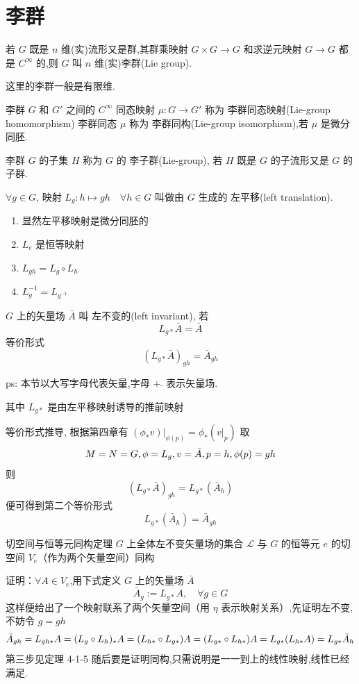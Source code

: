 \documentclass[../main.tex]{subfiles}
\begin{document}
 \chapter{李群}
 \begin{definition}
     若 $G$ 既是 $n$ 维(实)流形又是群,其群乘映射 $G\times G\rightarrow G$ 和求逆元映射 $G\rightarrow G$ 都是 $C^\infty$ 的,则 $G$ 叫 $n$ 维(实)李群(Lie group).
 \end{definition}
     这里的李群一般是有限维.
 \begin{definition}
     李群 $G$ 和 $G'$ 之间的 $C^\infty$ 同态映射 $\mu : G\rightarrow G'$ 称为 李群同态映射(Lie-group homomorphism) 李群同态 $\mu$ 称为 李群同构(Lie-group isomorphism),若 $\mu$ 是微分同胚.
 \end{definition}
 \begin{definition}
     李群 $G$ 的子集 $H$ 称为 $G$ 的 李子群(Lie-group), 若 $H$ 既是 $G$ 的子流形又是 $G$ 的子群.
 \end{definition}
 \begin{definition}
      $\forall g \in G$, 映射 $L_g : h \mapsto gh \quad \forall h \in G$ 叫做由 $G$ 生成的 左平移(left translation).
 \end{definition}
 \begin{enumerate}
     \item 显然左平移映射是微分同胚的
     \item $L_e$ 是恒等映射
     \item $L_{gh} = L_g \circ L_h$
     \item $L_g^{-1} = L_{g^{-1}}$
 \end{enumerate}
 \begin{definition}
      $G$ 上的矢量场 $\bar{A}$ 叫 左不变的(left invariant), 若
     $$
     L_{g*} \bar{A} = \bar{A}
     $$
     等价形式
     $$
     (L_{g*}\bar{A})_{gh} = \bar{A}_{gh}
     $$
 \end{definition}
 ps: 本节以大写字母代表矢量,字母 $+\bar{}$ 表示矢量场.

 其中 $L_{g*}$ 是由左平移映射诱导的推前映射

 等价形式推导, 根据第四章有 $(\phi_*v)|_{\phi(p)} = \phi_*(v|_p)$
 取
     $$
     M = N = G,\phi = L_g, v = \bar{A}, p = h, \phi(p) = gh\\
     $$
 则
  $$ (L_{g *}\bar{A})_{gh} = L_{g*}(\bar{A}_h) $$
 便可得到第二个等价形式
 $$ L_{g*}(\bar{A}_h) =\bar{A}_{gh} $$
 \begin{theorem}{}{切空间与恒等元同构定理}
     $G$ 上全体左不变矢量场的集合 $\mathscr{L}$ 与 $G$ 的恒等元 $e$ 的切空间 $V_e$（作为两个矢量空间）同构
 \end{theorem}
 证明：$\forall A \in V_e$,用下式定义 $G$ 上的矢量场 $\bar{A}$
     $$ \bar{A}_g := L_{g*}A,\quad\forall g \in G $$
 这样便给出了一个映射联系了两个矢量空间（用 $\eta$ 表示映射关系）,先证明左不变,不妨令 $g = gh$
     $$ \bar{A}_{gh} = L_{gh *}A = (L_g\circ L_h)_* A = (L_{h *}\circ L_{g*})A = (L_{g *}\circ L_{h*})A \\= L_{g *}(L_{h*}A) = L_{g*}\bar{A}_h $$
 第三步见定理 4-1-5
 随后要是证明同构,只需说明是一一到上的线性映射,线性已经满足.
\end{document}
